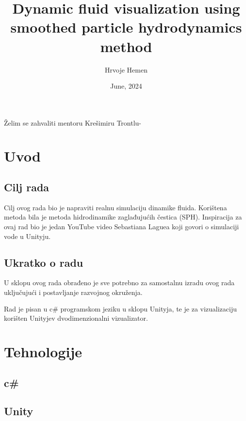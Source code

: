 \documentclass[diplomskirad]{fer}
\title{Dynamic fluid visualization using smoothed particle hydrodynamics method}
\author{Hrvoje Hemen}
\date{June, 2024}
\begin{document}
    \maketitle
    \begin{zahvale}
        Želim se zahvaliti mentoru Krešimiru Trontlu-
    \end{zahvale}
    \mainmatter
    \tableofcontents
    \chapter{Uvod}\label{ch:uvod}

    \section{Cilj rada}\label{sec:cilj-rada}

    Cilj ovog rada bio je napraviti realnu simulaciju dinamike fluida.
    Korištena metoda bila je metoda hidrodinamike zaglađujućih čestica (SPH).
    Inspiracija za ovaj rad bio je jedan YouTube video Sebastiana Laguea koji govori o simulaciji vode u Unityju.

    \section{Ukratko o radu}\label{sec:ukratko-o-radu}

    U sklopu ovog rada obrađeno je sve potrebno za samostalnu izradu ovog rada uključujući i postavljanje razvojnog okruženja.

    Rad je pisan u c\# programskom jeziku u sklopu Unityja, te je za vizualizaciju korišten Unityjev dvodimenzionalni vizualizator.


    \chapter{Tehnologije}\label{ch:tehnologije}

    \section{c\#}\label{sec:c}



    \section{Unity}\label{sec:unity}
\end{document}
